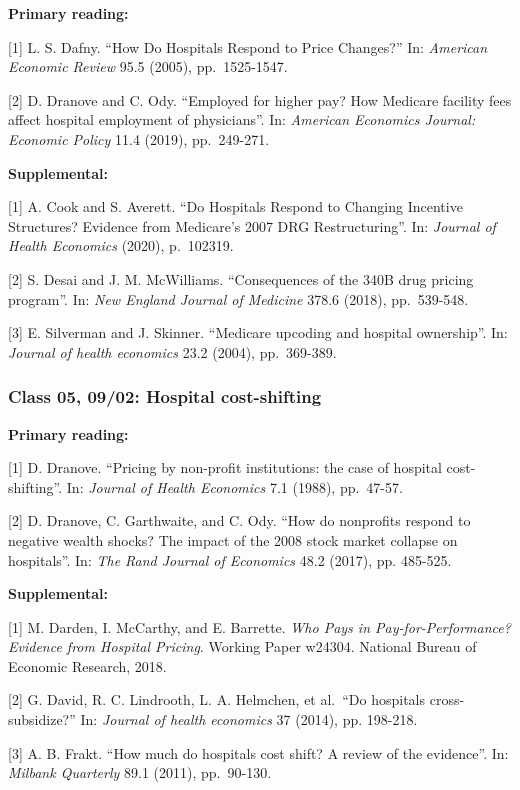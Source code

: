 \documentclass[11pt,]{article}
\begin{document}
\textbf{Primary reading:}

{[}1{]} L. S. Dafny. ``How Do Hospitals Respond to Price Changes?'' In:
\emph{American Economic Review} 95.5 (2005), pp.~1525-1547.

{[}2{]} D. Dranove and C. Ody. ``Employed for higher pay? How Medicare
facility fees affect hospital employment of physicians''. In:
\emph{American Economics Journal: Economic Policy} 11.4 (2019),
pp.~249-271.

\textbf{Supplemental:}

{[}1{]} A. Cook and S. Averett. ``Do Hospitals Respond to Changing
Incentive Structures? Evidence from Medicare's 2007 DRG Restructuring''.
In: \emph{Journal of Health Economics} (2020), p.~102319.

{[}2{]} S. Desai and J. M. McWilliams. ``Consequences of the 340B drug
pricing program''. In: \emph{New England Journal of Medicine} 378.6
(2018), pp.~539-548.

{[}3{]} E. Silverman and J. Skinner. ``Medicare upcoding and hospital
ownership''. In: \emph{Journal of health economics} 23.2 (2004),
pp.~369-389.

\hypertarget{class-05-0902-hospital-cost-shifting}{%
\subsubsection{Class 05, 09/02: Hospital
cost-shifting}\label{class-05-0902-hospital-cost-shifting}}

\textbf{Primary reading:}

{[}1{]} D. Dranove. ``Pricing by non-profit institutions: the case of
hospital cost-shifting''. In: \emph{Journal of Health Economics} 7.1
(1988), pp.~47-57.

{[}2{]} D. Dranove, C. Garthwaite, and C. Ody. ``How do nonprofits
respond to negative wealth shocks? The impact of the 2008 stock market
collapse on hospitals''. In: \emph{The Rand Journal of Economics} 48.2
(2017), pp. 485-525.

\textbf{Supplemental:}

{[}1{]} M. Darden, I. McCarthy, and E. Barrette. \emph{Who Pays in
Pay-for-Performance? Evidence from Hospital Pricing}. Working Paper
w24304. National Bureau of Economic Research, 2018.

{[}2{]} G. David, R. C. Lindrooth, L. A. Helmchen, et al.~``Do hospitals
cross-subsidize?'' In: \emph{Journal of health economics} 37 (2014), pp.
198-218.

{[}3{]} A. B. Frakt. ``How much do hospitals cost shift? A review of the
evidence''. In: \emph{Milbank Quarterly} 89.1 (2011), pp.~90-130.
\end{document}
